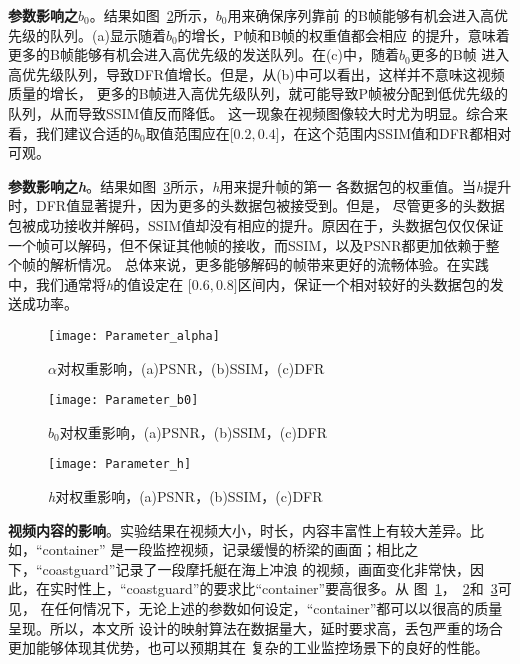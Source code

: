 \textbf{参数影响之$b_{0}$}。结果如图~\ref{fig:parameter_b0}所示，$b_{0}$用来确保序列靠前
的B帧能够有机会进入高优先级的队列。(a)显示随着$b_{0}$的增长，P帧和B帧的权重值都会相应
的提升，意味着更多的B帧能够有机会进入高优先级的发送队列。在(c)中，随着$b_{0}$更多的B帧
进入高优先级队列，导致DFR值增长。但是，从(b)中可以看出，这样并不意味这视频质量的增长，
更多的B帧进入高优先级队列，就可能导致P帧被分配到低优先级的队列，从而导致SSIM值反而降低。
这一现象在视频图像较大时尤为明显。综合来看，我们建议合适的$b_{0}$取值范围应在$\lbrack0.2,
0.4\rbrack$，在这个范围内SSIM值和DFR都相对可观。

\textbf{参数影响之\emph{h}}。结果如图~\ref{fig:parameter_h}所示，\emph{h}用来提升帧的第一
各数据包的权重值。当\emph{h}提升时，DFR值显著提升，因为更多的头数据包被接受到。但是，
尽管更多的头数据包被成功接收并解码，SSIM值却没有相应的提升。原因在于，头数据包仅仅保证
一个帧可以解码，但不保证其他帧的接收，而SSIM，以及PSNR都更加依赖于整个帧的解析情况。
总体来说，更多能够解码的帧带来更好的流畅体验。在实践中，我们通常将\emph{h}的值设定在
$\lbrack0.6,0.8\rbrack$区间内，保证一个相对较好的头数据包的发送成功率。

\begin{figure}[H] %
  \centering
  \texttt{[image: Parameter\_alpha]}
  \caption{$\alpha$对权重影响，(a)PSNR，(b)SSIM，(c)DFR}
  \label{fig:parameter_alpha}
\end{figure}
\begin{figure}[H] %
  \centering
  \texttt{[image: Parameter\_b0]}
  \caption{$b_{0}$对权重影响，(a)PSNR，(b)SSIM，(c)DFR}
  \label{fig:parameter_b0}
\end{figure}
\begin{figure}[H] %
  \centering
  \texttt{[image: Parameter\_h]}
  \caption{\emph{h}对权重影响，(a)PSNR，(b)SSIM，(c)DFR}
  \label{fig:parameter_h}
\end{figure}

\textbf{视频内容的影响}。实验结果在视频大小，时长，内容丰富性上有较大差异。比如，“container”
是一段监控视频，记录缓慢的桥梁的画面；相比之下，“coastguard”记录了一段摩托艇在海上冲浪
的视频，画面变化非常快，因此，在实时性上，“coastguard”的要求比“container”要高很多。从
图~\ref{fig:parameter_alpha}，~\ref{fig:parameter_b0}和~\ref{fig:parameter_h}可见，
在任何情况下，无论上述的参数如何设定，“container”都可以以很高的质量呈现。所以，本文所
设计的映射算法在数据量大，延时要求高，丢包严重的场合更加能够体现其优势，也可以预期其在
复杂的工业监控场景下的良好的性能。

